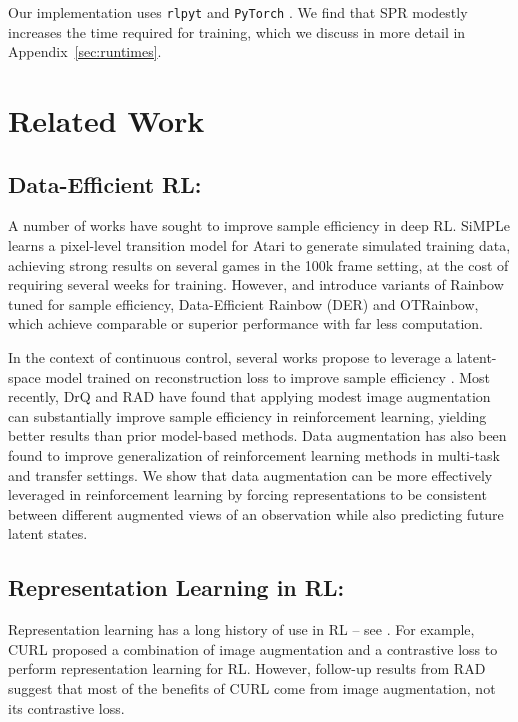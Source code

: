 Our implementation uses \texttt{rlpyt} \citep{rlpyt} and \texttt{PyTorch} \citep{pytorch}.  We find that SPR modestly increases the time required for training, which we discuss in more detail in Appendix~\ref{sec:runtimes}.

\section{Related Work}

\subsection{Data-Efficient RL:}
A number of works have sought to improve sample efficiency in deep RL. SiMPLe \citep{simple} learns a pixel-level transition model for Atari to generate simulated training data, achieving strong results on several games in the 100k frame setting, at the cost of requiring several weeks for training.  However, \cite{der} and \cite{kielak2020do} introduce variants of Rainbow \citep{hessel2018rainbow} tuned for sample efficiency, Data-Efficient Rainbow (DER) and OTRainbow, which achieve comparable or superior performance with far less computation.

In the context of continuous control, several works propose to leverage a latent-space model trained on reconstruction loss to improve sample efficiency \citep{hafner2019learning, lee2019stochastic, hafner2019dream}.
Most recently, DrQ \citep{drq} and RAD \citep{rad} have found that applying modest image augmentation can substantially improve sample efficiency in reinforcement learning, yielding better results than prior model-based methods. Data augmentation has also been found to improve generalization of reinforcement learning methods \citep{combes2018learning, rad} in multi-task and transfer settings. We show that data augmentation can be more effectively leveraged in reinforcement learning by forcing representations to be consistent between different augmented views of an observation while also predicting future latent states.

\subsection{Representation Learning in RL:}
Representation learning has a long history of use in RL -- see \cite{lesort2018state}. For example, CURL \citep{curl} proposed a combination of image augmentation and a contrastive loss to perform representation learning for RL.  However, follow-up results from RAD \citep{rad} suggest that most of the benefits of CURL come from image augmentation, not its contrastive loss.

